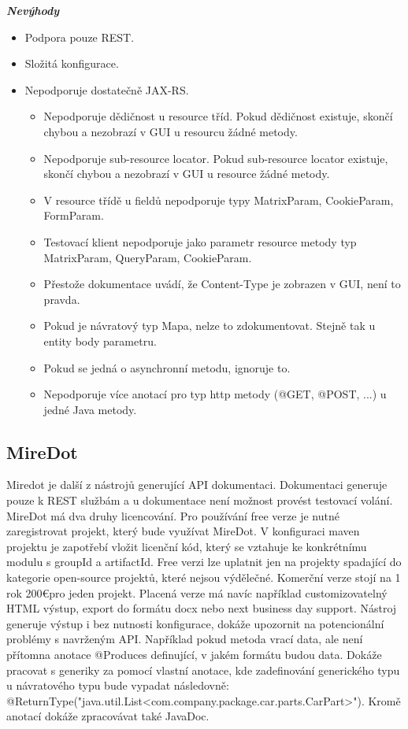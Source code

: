 \documentclass[11pt,twoside,a4paper]{book}
\begin{document}
\textbf{\textit{Nevýhody}}

\begin{itemize}
  \item Podpora pouze REST.
  \item Složitá konfigurace.
  \item Nepodporuje dostatečně JAX-RS.
  \begin{itemize}
    \item Nepodporuje dědičnost u resource tříd. Pokud dědičnost existuje, skončí chybou a
nezobrazí v GUI u resourcu žádné metody.
    \item Nepodporuje sub-resource locator. Pokud sub-resource locator existuje, skončí
chybou a nezobrazí v GUI u resource žádné metody.
    \item V resource třídě u fieldů nepodporuje typy MatrixParam, CookieParam,
FormParam.
    \item Testovací klient nepodporuje jako parametr resource metody typ
MatrixParam, QueryParam, CookieParam.
    \item Přestože dokumentace uvádí, že Content-Type je zobrazen v GUI, není to
pravda.
    \item Pokud je návratový typ Mapa, nelze to zdokumentovat. Stejně tak u
entity body parametru.
    \item Pokud se jedná o asynchronní metodu, ignoruje to.
    \item Nepodporuje více anotací pro typ http metody (@GET, @POST, ...) u
jedné Java metody.
\end{itemize}
\end{itemize}

\subsection{MireDot}

Miredot je další z nástrojů generující API dokumentaci. Dokumentaci generuje
pouze k REST službám a u dokumentace není možnost provést testovací volání. 
MireDot má dva druhy licencování. Pro používání free verze je nutné zaregistrovat 
projekt, který bude využívat MireDot. V konfiguraci maven projektu je zapotřebí 
vložit licenční kód, který se vztahuje ke konkrétnímu modulu s groupId a artifactId. 
Free verzi lze uplatnit jen na projekty spadající do kategorie open-source projektů, 
které nejsou výdělečné. Komerční verze stojí na 1 rok 200\euro pro jeden
projekt.
Placená verze má navíc například customizovatelný HTML výstup, export do formátu 
docx nebo next business day support. Nástroj generuje výstup i bez nutnosti 
konfigurace, dokáže upozornit na potencionální problémy s navrženým API. Například 
pokud metoda vrací data, ale není přítomna anotace @Produces definující, v jakém 
formátu budou data. Dokáže pracovat s generiky za pomocí vlastní anotace, kde 
zadefinování generického typu u návratového typu bude vypadat následovně: 
@ReturnType("java.util.List<com.company.package.car.parts.CarPart>"). Kromě 
anotací dokáže zpracovávat také JavaDoc.
\end{document}
